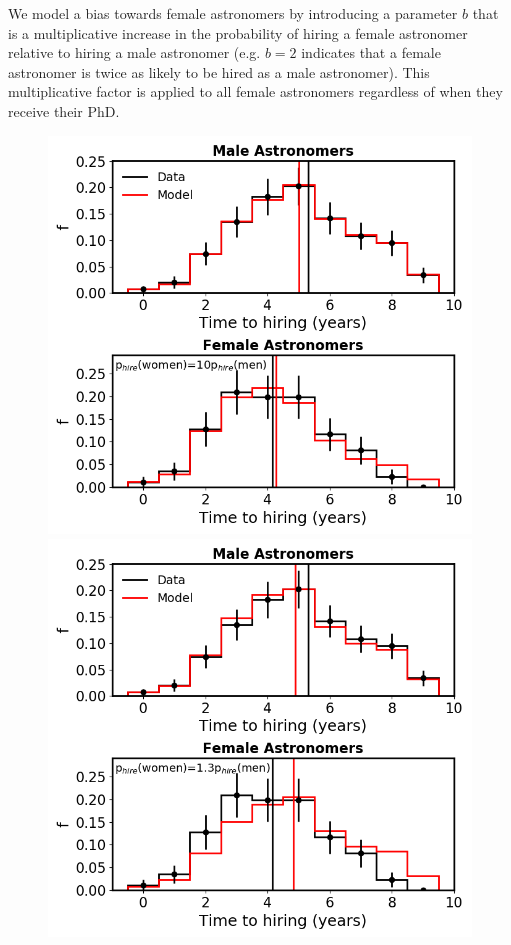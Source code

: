 \documentclass[modern]{aastex62}
\begin{document}
We model a bias towards female astronomers by introducing a parameter $b$ that is a multiplicative increase in the probability of hiring a female astronomer relative to hiring a male astronomer (e.g. $b=2$ indicates that a female astronomer is twice as likely to be hired as a male astronomer). This multiplicative factor is applied to all female astronomers regardless of when they receive their PhD. 

\begin{figure}[!hbt]
\center
\includegraphics[scale=.4]{model2_b10.png}
\includegraphics[scale=.4]{model2_b1p3.png}

\end{figure}
\end{document}
